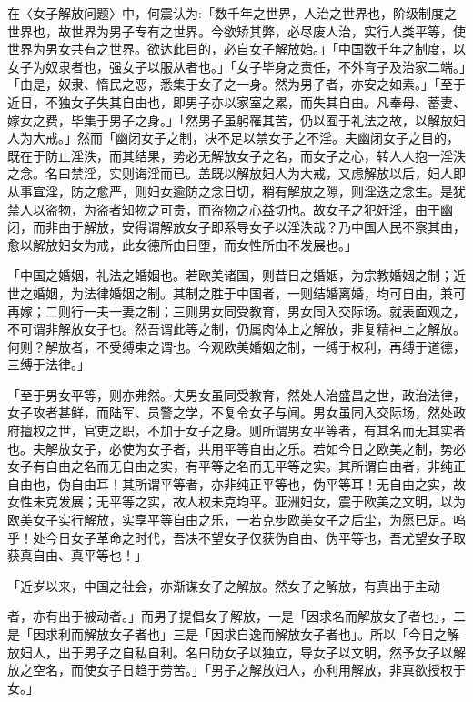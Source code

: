 在〈女子解放问题〉中，何震认为:「数千年之世界，人治之世界也，阶级制度之世界也，故世界为男子专有之世界。今欲矫其弊，必尽废人治，实行人类平等，使世界为男女共有之世界。欲达此目的，必自女子解放始。」「中国数千年之制度，以女子为奴隶者也，强女子以服从者也。」「女子毕身之责任，不外育子及治家二端。」「由是，奴隶、惰民之恶，悉集于女子之一身。然为男子者，亦安之如素。」「至于近日，不独女子失其自由也，即男子亦以家室之累，而失其自由。凡奉母、蓄妻、嫁女之费，毕集于男子之身。」「然男子虽躬罹其苦，仍以囿于礼法之故，以解放妇人为大戒。」然而「幽闭女子之制，决不足以禁女子之不淫。夫幽闭女子之目的，既在于防止淫泆，而其结果，势必无解放女子之名，而女子之心，转人人抱一淫泆之念。名曰禁淫，实则诲淫而已。盖既以解放妇人为大戒，又虑解放以后，妇人即从事宣淫，防之愈严，则妇女逾防之念日切，稍有解放之隙，则淫迭之念生。是犹禁人以盗物，为盗者知物之可贵，而盗物之心益切也。故女子之犯奸淫，由于幽闭，而非由于解放，安得谓解放女子即系导女子以淫泆哉？乃中国人民不察其由，愈以解放妇女为戒，此女德所由日堕，而女性所由不发展也。」

「中国之婚姻，礼法之婚姻也。若欧美诸国，则昔日之婚姻，为宗教婚姻之制；近世之婚姻，为法律婚姻之制。其制之胜于中国者，一则结婚离婚，均可自由，兼可再嫁；二则行一夫一妻之制；三则男女同受教育，男女同入交际场。就表面观之，不可谓非解放女子也。然吾谓此等之制，仍属肉体上之解放，非复精神上之解放。何则？解放者，不受缚束之谓也。今观欧美婚姻之制，一缚于权利，再缚于道德，三缚于法律。」


「至于男女平等，则亦弗然。夫男女虽同受教育，然处人治盛昌之世，政治法律，女子攻者甚鲜，而陆军、员警之学，不复令女子与闻。男女虽同入交际场，然处政府擅权之世，官吏之职，不加于女子之身。则所谓男女平等者，有其名而无其实者也。夫解放女子，必使为女子者，共用平等自由之乐。若如今日之欧美之制，势必女子有自由之名而无自由之实，有平等之名而无平等之实。其所谓自由者，非纯正自由也，伪自由耳！其所谓平等者，亦非纯正平等也，伪平等耳！无自由之实，故女性未克发展；无平等之实，故人权未克均平。亚洲妇女，震于欧美之文明，以为欧美女子实行解放，实享平等自由之乐，一若克步欧美女子之后尘，为愿已足。呜乎！处今日女子革命之时代，吾决不望女子仅获伪自由、伪平等也，吾尤望女子取获真自由、真平等也！」

\begin{BookQuote}
「近岁以来，中国之社会，亦渐谋女子之解放。然女子之解放，有真出于主动
\end{BookQuote}

者，亦有出于被动者。」而男子提倡女子解放，一是「因求名而解放女子者也」，二是「因求利而解放女子者也」三是「因求自逸而解放女子者也」。所以「今日之解放妇人，出于男子之自私自利。名曰助女子以独立，导女子以文明，然予女子以解放之空名，而使女子日趋于劳苦。」「男子之解放妇人，亦利用解放，非真欲授权于女。」

